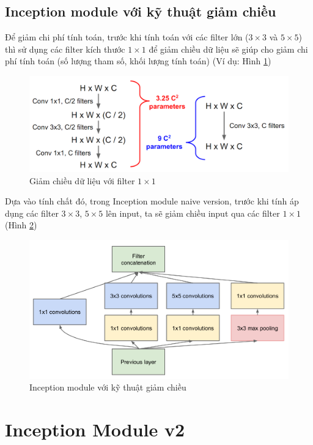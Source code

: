 \documentclass[a4paper,12pt]{report}
\begin{document}
\subsection{Inception module với kỹ thuật giảm chiều}
Để giảm chi phí tính toán, trước khi tính toán với các filter lớn ($3\times 3$ và $5 \times 5$) thì sử dụng các filter kích thước $1 \times 1$ để giảm chiều dữ liệu sẽ giúp cho giảm chi phí tính toán (số lượng tham số, khối lượng tính toán) (Ví dụ: Hình \ref{fig_reduce1x1})
\begin{figure}[H]
\centering
\includegraphics[scale=0.4]{reduce_1x1.png}
\caption{Giảm chiều dữ liệu với filter $1 \times 1$}
\label{fig_reduce1x1}
\end{figure}
\par Dựa vào tính chất đó, trong Inception module naive version, trước khi tính áp dụng các filter $3 \times 3$, $5 \times 5$ lên input, ta sẽ giảm chiều input qua các filter $1 \times 1$ (Hình \ref{fig_inception_reduce})
\begin{figure}[H]
\centering 
\includegraphics[scale=0.45]{inception_reduce.png}
\caption{Inception module với kỹ thuật giảm chiều}
\label{fig_inception_reduce}
\end{figure}

\section{Inception Module v2 \cite{rethinking}}
\end{document}
